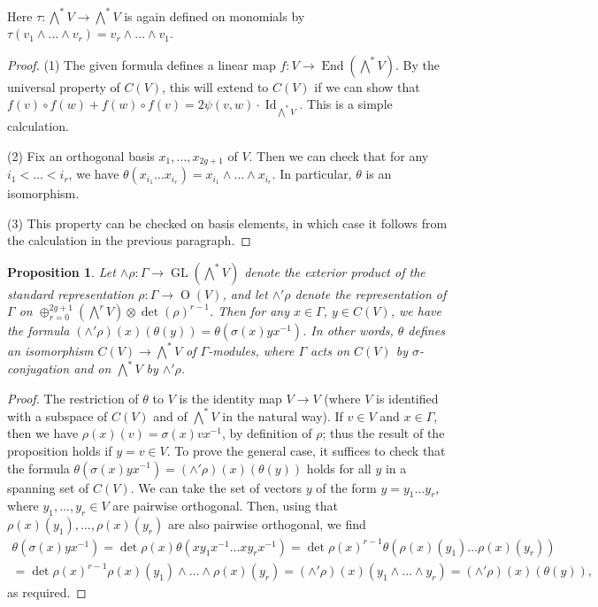 \documentclass{article} %
\newtheorem{proposition}{Proposition}[section]
\numberwithin{equation}{section}
\DeclareMathOperator{\GL}{GL}
\DeclareMathOperator{\OO}{O}
\DeclareMathOperator{\End}{End}
\begin{document}
Here $\tau : \bigwedge^\ast V \to \bigwedge^\ast V$ is again defined on monomials by $\tau( v_1 \wedge \dots \wedge v_r ) = v_r \wedge \dots \wedge v_1$.
\begin{proof}
    (1) The given formula defines a linear map $f : V \to \End(\bigwedge^\ast V)$. By the universal property of $C(V)$, this will extend to $C(V)$ if we can show that $f(v) \circ f(w) + f(w) \circ f(v) = 2 \psi(v, w) \cdot \operatorname{Id}_{\bigwedge^\ast V}$. This is a simple calculation.

    (2) Fix an orthogonal basis $x_1, \dots, x_{2g+1}$ of $V$. Then we can check that for any $i_1 < \dots < i_r$, we have $\theta(x_{i_1} \dots x_{i_r}) = x_{i_1} \wedge \dots \wedge x_{i_r}$. In particular, $\theta$ is an isomorphism.

    (3) This property can be checked on basis elements, in which case it follows from the calculation in the previous paragraph. 
\end{proof}
\begin{proposition}
    Let $\wedge \rho : \Gamma \to \GL(\bigwedge^\ast V)$ denote the exterior product of the standard representation $\rho : \Gamma \to \OO(V)$, and let $\wedge' \rho$ denote the representation of $\Gamma$ on $\oplus_{r = 0}^{2g+1} (\bigwedge^r V ) \otimes \det(\rho)^{r-1}$. Then for any $x \in \Gamma$, $y \in C(V)$, we have the formula $(\wedge' \rho)(x)(\theta(y)) = \theta(\sigma(x) y x^{-1})$. In other words, $\theta$ defines an isomorphism $C(V) \to \bigwedge^\ast V$ of $\Gamma$-modules, where $\Gamma$ acts on $C(V)$ by $\sigma$-conjugation and on $\bigwedge^\ast V$ by $\wedge' \rho$.
\end{proposition}
\begin{proof}
    The restriction of $\theta$ to $V$ is the identity map $V \to V$ (where $V$ is identified with a subspace of $C(V)$ and of $\bigwedge^\ast V$ in the natural way).  If $v \in V$ and $x \in \Gamma$, then we have $\rho(x)(v) = \sigma(x) v x^{-1}$, by definition of $\rho$; thus the result of the proposition holds if $y =v \in V$. To prove the general case, it suffices to check that the formula $\theta(\sigma(x) y x^{-1}) = (\wedge' \rho)(x)(\theta(y))$ holds for all $y$ in a spanning set of $C(V)$. We can take the set of vectors $y$ of the form $y = y_1 \dots y_r$, where $y_1, \dots, y_r \in V$ are pairwise orthogonal. Then, using that $\rho(x)(y_1), \dots, \rho(x)(y_r)$ are also pairwise orthogonal, we find
    \begin{multline*}  \theta( \sigma(x) y x^{-1}) = \det \rho(x) \theta( x y_1 x^{-1} \dots x y_r x^{-1}) = \det \rho(x)^{r-1} \theta(\rho(x)(y_1) \dots \rho(x)(y_r)) \\ = \det \rho(x)^{r-1}\rho(x)(y_1) \wedge \dots \wedge \rho(x)(y_r) = (\wedge' \rho)(x)(y_1 \wedge \dots \wedge y_r) = (\wedge' \rho)(x)(\theta(y)), 
    \end{multline*}
    as required. 
\end{proof}
\end{document}
